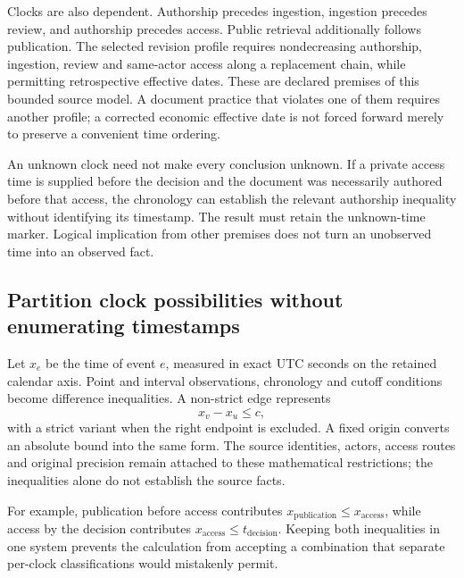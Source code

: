 Clocks are also dependent. Authorship precedes ingestion, ingestion precedes review, and authorship precedes access. Public retrieval additionally follows publication. The selected revision profile requires nondecreasing authorship, ingestion, review and same-actor access along a replacement chain, while permitting retrospective effective dates. These are declared premises of this bounded source model. A document practice that violates one of them requires another profile; a corrected economic effective date is not forced forward merely to preserve a convenient time ordering.

An unknown clock need not make every conclusion unknown. If a private access time is supplied before the decision and the document was necessarily authored before that access, the chronology can establish the relevant authorship inequality without identifying its timestamp. The result must retain the unknown-time marker. Logical implication from other premises does not turn an unobserved time into an observed fact.

\subsection{Partition clock possibilities without enumerating timestamps}

Let $x_e$ be the time of event $e$, measured in exact UTC seconds on the retained calendar axis. Point and interval observations, chronology and cutoff conditions become difference inequalities. A non-strict edge represents
\begin{equation}
 x_v-x_u\leq c,
 \label{eq:temporal-difference-edge}
\end{equation}
with a strict variant when the right endpoint is excluded. A fixed origin converts an absolute bound into the same form. The source identities, actors, access routes and original precision remain attached to these mathematical restrictions; the inequalities alone do not establish the source facts.

For example, publication before access contributes $x_{\mathrm{publication}}\leq x_{\mathrm{access}}$, while access by the decision contributes $x_{\mathrm{access}}\leq t_{\mathrm{decision}}$. Keeping both inequalities in one system prevents the calculation from accepting a combination that separate per-clock classifications would mistakenly permit.

